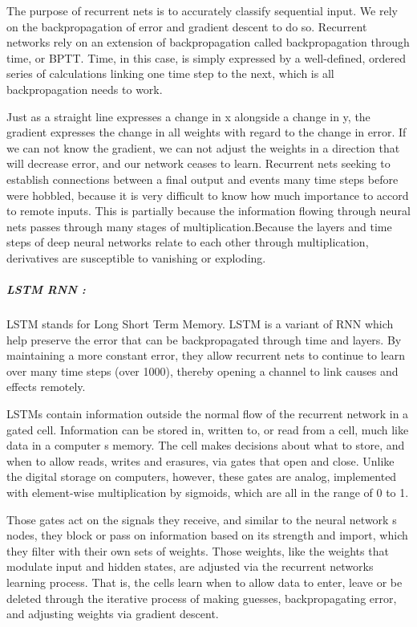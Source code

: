 The purpose of recurrent nets is to accurately classify sequential input. We rely on the backpropagation of error and gradient descent to do so. Recurrent networks rely on an extension of backpropagation called backpropagation through time, or BPTT. Time, in this case, is simply expressed by a well-defined, ordered series of calculations linking one time step to the next, which is all backpropagation needs to work.

Just as a straight line expresses a change in x alongside a change in y, the gradient expresses the change in all weights with regard to the change in error. If we can not know the gradient, we can not adjust the weights in a direction that will decrease error, and our network ceases to learn. Recurrent nets seeking to establish connections between a final output and events many time steps before were hobbled, because it is very difficult to know how much importance to accord to remote inputs. This is partially because the information flowing through neural nets passes through many stages of multiplication.Because the layers and time steps of deep neural networks relate to each other through multiplication, derivatives are susceptible to vanishing or exploding.

\subparagraph{LSTM RNN :} LSTM stands for Long Short Term Memory. LSTM is a variant of RNN which help preserve the error that can be backpropagated through time and layers. By maintaining a more constant error, they allow recurrent nets to continue to learn over many time steps (over 1000), thereby opening a channel to link causes and effects remotely.

LSTMs contain information outside the normal flow of the recurrent network in a gated cell. Information can be stored in, written to, or read from a cell, much like data in a computer \textquotesingle s memory. The cell makes decisions about what to store, and when to allow reads, writes and erasures, via gates that open and close. Unlike the digital storage on computers, however, these gates are analog, implemented with element-wise multiplication by sigmoids, which are all in the range of 0 to 1.

Those gates act on the signals they receive, and similar to the neural network \textquotesingle s nodes, they block or pass on information based on its strength and import, which they filter with their own sets of weights. Those weights, like the weights that modulate input and hidden states, are adjusted via the recurrent networks learning process. That is, the cells learn when to allow data to enter, leave or be deleted through the iterative process of making guesses, backpropagating error, and adjusting weights via gradient descent.

